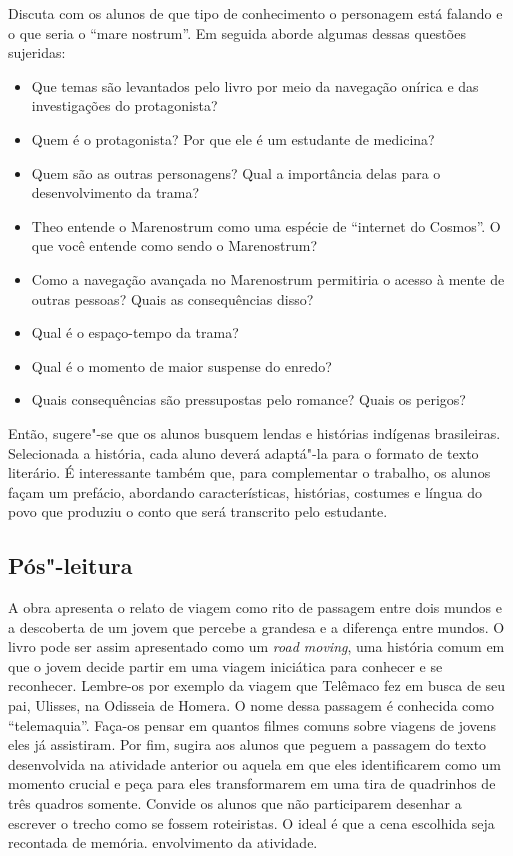 \documentclass[12pt]{extarticle}
\begin{document}
Discuta com os alunos de que tipo de conhecimento o personagem está 
falando e o que seria o ``mare nostrum''. Em seguida aborde algumas dessas 
questões sujeridas:

\begin{itemize}
\item Que temas são levantados pelo livro por meio da navegação onírica e das investigações do protagonista?
\item Quem é o protagonista? Por que ele é um estudante de medicina?
\item Quem são as outras personagens? Qual a importância delas para o desenvolvimento da trama?
\item Theo entende o Marenostrum como uma espécie de “internet do Cosmos”. O que você entende como sendo o Marenostrum?
\item Como a navegação avançada no Marenostrum permitiria o acesso à mente de outras pessoas? Quais as consequências disso?
\item Qual é o espaço-tempo da trama?
\item Qual é o momento de maior suspense do enredo?
\item Quais consequências são pressupostas pelo romance? Quais os perigos?
\end{itemize}

Então, sugere"-se que os alunos busquem lendas e histórias
indígenas brasileiras. Selecionada a história, cada aluno deverá
adaptá"-la para o formato de texto literário. É interessante também que,
para complementar o trabalho, os alunos façam um prefácio, abordando
características, histórias, costumes e língua do povo que produziu o
conto que será transcrito pelo estudante.



\subsection{Pós"-leitura}

\bnccativividadesposleitura




A obra apresenta o relato de viagem como rito de passagem entre dois 
mundos e a descoberta de um jovem que percebe a grandesa e a diferença
entre mundos. O livro pode ser assim apresentado como um \textit{road moving}, 
uma história comum em que o jovem decide partir em uma viagem iniciática
para conhecer e se reconhecer. Lembre-os por exemplo da viagem que 
Telêmaco fez em busca de seu pai, Ulisses, na Odisseia de Homera. 
O nome dessa passagem é conhecida como ``telemaquia''. Faça-os pensar
em quantos filmes comuns sobre viagens de jovens eles já assistiram. 
Por fim, sugira aos alunos 
que peguem a passagem do texto desenvolvida
na atividade anterior ou aquela em que eles identificarem como um
momento crucial e peça para eles transformarem em uma tira de quadrinhos
de três quadros somente. Convide os alunos que não participarem desenhar
a escrever o trecho como se fossem roteiristas. O ideal é que a cena 
escolhida seja recontada de memória. 
envolvimento da atividade. 
\end{document}
